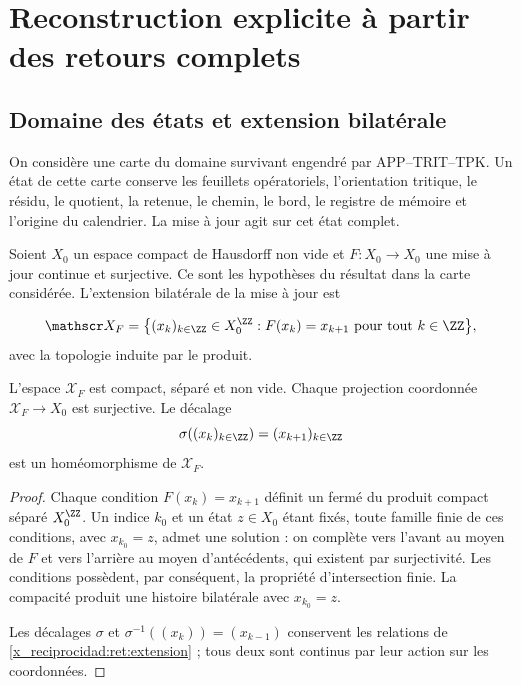 \chapter{Reconstruction explicite à partir des retours complets}
\label{x_reciprocidad:ret:seccion}

\section{Domaine des états et extension bilatérale}

On considère une carte du domaine survivant engendré par
APP--TRIT--TPK. Un état de cette carte conserve les feuillets opératoriels,
l’orientation tritique, le résidu, le quotient, la retenue, le chemin,
le bord, le registre de mémoire et l’origine du calendrier.
La mise à jour agit sur cet état complet.

Soient \(X_0\) un espace compact de Hausdorff non vide et
\(F:X_0\to X_0\) une mise à jour continue et surjective.
Ce sont les hypothèses du résultat dans la carte considérée.
L’extension bilatérale de la mise à jour est

\begin{equation}
 \mathscr X_F=
 \bigl\{(x_k)_{k\in\ZZ}\in X_0^{\ZZ}:
                  F(x_k)=x_{k+1}\text{ pour tout }k\in\ZZ\bigr\},
 \label{x_reciprocidad:ret:extension}
\end{equation}
avec la topologie induite par le produit.

\begin{lemma}
\label{x_reciprocidad:ret:existencia}
L’espace \(\mathscr X_F\) est compact, séparé et non vide.
Chaque projection coordonnée \(\mathscr X_F\to X_0\) est surjective.
Le décalage
\[
 \sigma((x_k)_{k\in\ZZ})=(x_{k+1})_{k\in\ZZ}
\]
est un homéomorphisme de \(\mathscr X_F\).
\end{lemma}
\begin{proof}
Chaque condition \(F(x_k)=x_{k+1}\) définit un fermé du produit
compact séparé \(X_0^{\ZZ}\).
Un indice \(k_0\) et un état \(z\in X_0\) étant fixés, toute famille
finie de ces conditions, avec \(x_{k_0}=z\), admet une solution :
on complète vers l’avant au moyen de \(F\) et vers l’arrière au moyen
d’antécédents, qui existent par surjectivité. Les conditions possèdent,
par conséquent, la propriété d’intersection finie. La compacité produit
une histoire bilatérale avec \(x_{k_0}=z\).

Les décalages \(\sigma\) et
\(\sigma^{-1}((x_k))=(x_{k-1})\) conservent les relations de
\eqref{x_reciprocidad:ret:extension} ; tous deux sont continus par leur action sur les coordonnées.
\end{proof}

